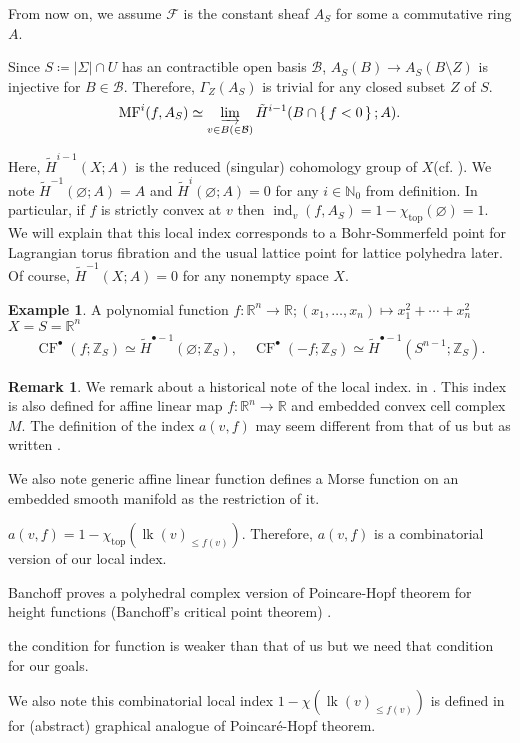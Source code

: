 \documentclass[a4paper,dvipdfmx,reqno,12pt]{amsart}
\theoremstyle{definition}
\newtheorem{Eg}[Thm]{Example}
\newtheorem{Rmk}[Thm]{Remark}
\newcommand{\deq}{\coloneqq}
\newcommand{\emp}{\varnothing}%
\newcommand{\R}{\mathbb{R}}%
\newcommand{\Z}{\mathbb{Z}}%
\newcommand{\N}{\mathbb{N}_{0}}%
\newcommand{\mcal}[1]{\mathcal{#1}}%
\newcommand{\opn}[1]{\operatorname{#1}}
\numberwithin{equation}{section}
\begin{document}
From now on, we assume $\mcal{F}$ is
the constant sheaf $A_S$ for some a commutative ring $A$.

Since $S\deq |\Sigma|\cap U$ has an contractible open basis $\mcal{B}$,
$A_S(B)\to A_S(B\setminus Z)$ is injective for $B\in \mcal{B}$.
Therefore, $\Gamma_{Z}(A_S)$ is trivial for any closed subset $Z$ of $S$.
\begin{align}
  \opn{MF}^{i}(f,A_S)\simeq \varinjlim_{v\in B(\in \mcal{B})}
  \tilde{H}^{i-1}(B\cap\set{f<0};A).
\end{align}

Here, $\tilde{H}^{i-1}(X;A)$ is the reduced (singular) cohomology group
of $X$(cf. \cite[p.199]{hatcherAlgebraicTopology2002a}).
We note $\tilde{H}^{-1}(\emp;A)=A$ and $\tilde{H}^{i}(\emp;A)=0$
for any $i\in \N$ from definition.
In particular, if $f$ is strictly convex at $v$
then $\opn{ind}_v(f,A_S)=1-\chi_{\opn{top}}(\emp)=1$.
We will explain that this local index corresponds to a Bohr-Sommerfeld point for Lagrangian torus fibration and the usual lattice point for lattice polyhedra later.
Of course, $\tilde{H}^{-1}(X;A)=0$ for any nonempty space $X$.

\begin{Eg}
  A polynomial function $f:\R^{n}\to \R;(x_1,\ldots,x_n)\mapsto x_1^{2}+\cdots+x_n^{2}$
  $X=S=\R^{n}$
  \begin{align}
    \opn{CF}^{\bullet}(f;\Z_S)\simeq \tilde{H}^{\bullet-1}(\emp;\Z_S),
    \quad \opn{CF}^{\bullet}(-f;\Z_S) \simeq \tilde{H}^{\bullet-1}(S^{n-1};\Z_S).
  \end{align}

\end{Eg}

\begin{Rmk}
  We remark about a historical note of the local index.
  in \cite[p.246]{MR225327}.
  This index is also defined for affine linear map $f:\R^{n}\to \R$ and embedded convex cell complex
  $M$.
  The definition of the index $a(v,f)$
  may seem different from that of us but as written .

  We also note generic affine linear function defines a Morse function
  on an embedded smooth manifold as the restriction of it.

  $a(v,f)=1-\chi_{\mathrm{top}}(\opn{lk}(v)_{\leq f(v)})$. Therefore, $a(v,f)$ is a combinatorial version of our local index.

  Banchoff proves a polyhedral complex version of Poincare-Hopf theorem
  for height functions (Banchoff's critical point theorem) \cite[Theorem 1]{MR225327}.

  the condition for function is weaker than that of us but we need that condition for our goals.

  We also note this combinatorial local index $1-\chi(\opn{lk}(v)_{\leq f(v)})$ is defined in
  \cite[3]{knill2012graph}
  for (abstract) graphical analogue of Poincar\'e-Hopf theorem.
\end{Rmk}
\end{document}
